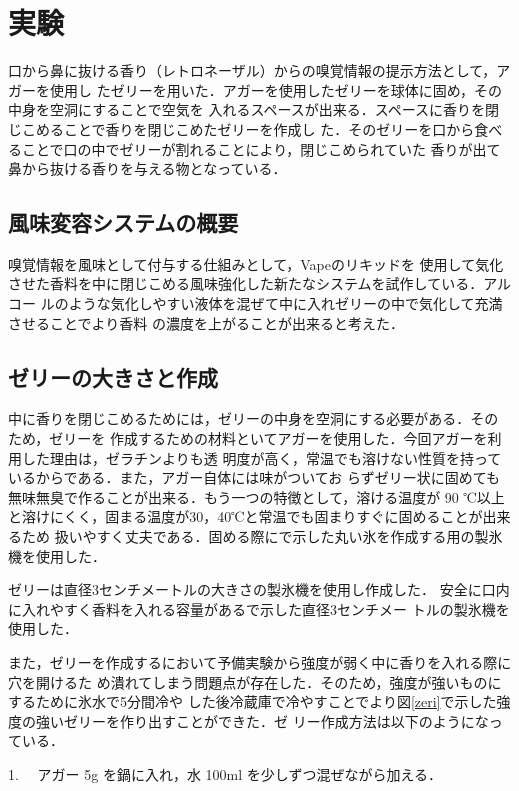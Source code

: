 \section{実験}

口から鼻に抜ける香り（レトロネーザル）からの嗅覚情報の提示方法として，アガーを使用し
たゼリーを用いた．アガーを使用したゼリーを球体に固め，その中身を空洞にすることで空気を
入れるスペースが出来る．スペースに香りを閉じこめることで香りを閉じこめたゼリーを作成し
た．そのゼリーを口から食べることで口の中でゼリーが割れることにより，閉じこめられていた
香りが出て鼻から抜ける香りを与える物となっている．

\subsection{風味変容システムの概要}

嗅覚情報を風味として付与する仕組みとして，Vapeのリキッドを
使用して気化させた香料を中に閉じこめる風味強化した新たなシステムを試作している．アルコー
ルのような気化しやすい液体を混ぜて中に入れゼリーの中で気化して充満させることでより香料
の濃度を上がることが出来ると考えた．


\subsection{ゼリーの大きさと作成}

中に香りを閉じこめるためには，ゼリーの中身を空洞にする必要がある．そのため，ゼリーを
作成するための材料といてアガーを使用した．今回アガーを利用した理由は，ゼラチンよりも透
明度が高く，常温でも溶けない性質を持っているからである．また，アガー自体には味がついてお
らずゼリー状に固めても無味無臭で作ることが出来る．もう一つの特徴として，溶ける温度が 90
℃以上と溶けにくく，固まる温度が30，40℃と常温でも固まりすぐに固めることが出来るため
扱いやすく丈夫である．固める際にで示した丸い氷を作成する用の製氷機を使用した．


ゼリーは直径3センチメートルの大きさの製氷機を使用し作成した．
安全に口内に入れやすく香料を入れる容量があるで示した直径3センチメー
トルの製氷機を使用した．


また，ゼリーを作成するにおいて予備実験から強度が弱く中に香りを入れる際に穴を開けるた
め潰れてしまう問題点が存在した．そのため，強度が強いものにするために氷水で5分間冷や
した後冷蔵庫で冷やすことでより図\ref{zeri}で示した強度の強いゼリーを作り出すことができた．ゼ
リー作成方法は以下のようになっている．


1. 　アガー 5g を鍋に入れ，水 100ml を少しずつ混ぜながら加える．


